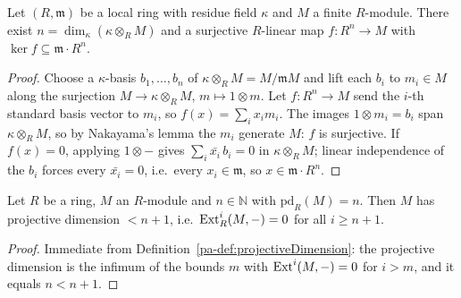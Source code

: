 \begin{lemma}
  \label{pa-lem:minimal_surjection}
  \leanok

  Let \((R, \mathfrak m)\) be a local ring with residue field \(\kappa\) and \(M\) a
  finite \(R\)-module. There exist \(n = \dim_\kappa(\kappa \otimes_R M)\) and a
  surjective \(R\)-linear map \(f : R^n \to M\) with
  \(\ker f \subseteq \mathfrak m \cdot R^n\).
\end{lemma}
\begin{proof}
  \leanok
  Choose a \(\kappa\)-basis \(b_1, \dots, b_n\) of \(\kappa \otimes_R M = M/\mathfrak m M\)
  and lift each \(b_i\) to \(m_i \in M\) along the surjection
  \(M \to \kappa \otimes_R M\), \(m \mapsto 1 \otimes m\). Let \(f : R^n \to M\) send
  the \(i\)-th standard basis vector to \(m_i\), so
  \(f(x) = \sum_i x_i m_i\). The images \(1 \otimes m_i = b_i\) span
  \(\kappa \otimes_R M\), so by Nakayama's lemma the \(m_i\) generate \(M\): \(f\) is
  surjective. If \(f(x) = 0\), applying \(1 \otimes -\) gives
  \(\sum_i \bar{x_i}\, b_i = 0\) in \(\kappa \otimes_R M\); linear independence of the
  \(b_i\) forces every \(\bar{x_i} = 0\), i.e.\ every \(x_i \in \mathfrak m\), so
  \(x \in \mathfrak m \cdot R^n\).
\end{proof}

\begin{lemma}
  \label{pa-lem:pd_lt_of_pd_eq}
  \leanok

  Let \(R\) be a ring, \(M\) an \(R\)-module and \(n \in \mathbb{N}\) with
  \(\mathrm{pd}_R(M) = n\). Then \(M\) has projective dimension \(< n + 1\), i.e.\
  \(\operatorname{Ext}^i_R(M, -) = 0\) for all \(i \geq n + 1\).
\end{lemma}
\begin{proof}
  \leanok
  Immediate from Definition~\ref{pa-def:projectiveDimension}: the projective dimension is
  the infimum of the bounds \(m\) with \(\operatorname{Ext}^i(M,-) = 0\) for \(i > m\), and it equals
  \(n < n+1\).
\end{proof}

